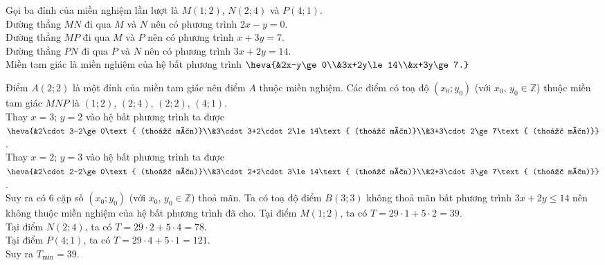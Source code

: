 \begin{ex}
{\begin{center}
		\end{center}
		Gọi ba đỉnh của miền nghiệm lần lượt là $M(1;2)$, $N(2;4)$ và $P(4;1)$.\\
		Đường thẳng $MN$ đi qua $M$ và $N$ nên có phương trình $2x-y=0$.\\
		Đường thẳng $MP$ đi qua $M$ và $P$ nên có phương trình $x+3y=7$.\\
		Đường thẳng $PN$ đi qua $P$ và $N$ nên có phương trình $3x+2y=14$.\\
		Miền tam giác là miền nghiệm của hệ bất phương trình $\heva{&2x-y\ge0\\&3x+2y\le14\\&x+3y\ge7.}$
		\begin{itemchoice}
			\itemch Điểm $A(2;2)$ là một đỉnh của miền tam giác nên điểm $A$  thuộc miền nghiệm.
			\itemch Các điểm có toạ độ $\left(x_0;y_0\right)$ (với $x_0$, $y_0\in\mathbb{Z}$) thuộc miền tam giác $MNP$ là $(1;2)$, $(2;4)$, $(2;2)$, $(4;1)$.\\
			Thay $x=3;\,y=2$ vào hệ bất phương trình ta được  $\heva{&2\cdot3-2\ge0\text{ (thoả mãn)}\\&3\cdot3+2\cdot2\le14\text{ (thoả mãn)}\\&3+3\cdot2\ge7\text{ (thoả mãn)}}$.\\
			Thay $x=2;\,y=3$ vào hệ bất phương trình ta được  $\heva{&2\cdot2-2\ge0\text{ (thoả mãn)}\\&3\cdot2+2\cdot3\le14\text{ (thoả mãn)}\\&2+3\cdot3\ge7\text{ (thoả mãn)}}$.\\
			Suy ra có $6$ cặp số $\left(x_0;y_0\right)$ (với $x_0$, $y_0\in\mathbb{Z}$) thoả mãn.
			\itemch Ta có toạ độ điểm $B(3;3)$ không thoả mãn bất phương trình $3x+2y\le14$ nên không thuộc miền nghiệm của hệ bất phương trình đã cho.
			\itemch Tại điểm $M(1;2)$, ta có $T=29\cdot1+5\cdot2=39$.\\
			Tại điểm $N(2;4)$, ta có $T=29\cdot2+5\cdot4=78$.\\
			Tại điểm $P(4;1)$, ta có $T=29\cdot4+5\cdot1=121$.\\
			Suy ra $T_{\min}=39$.
		\end{itemchoice}
	}
\end{ex}

